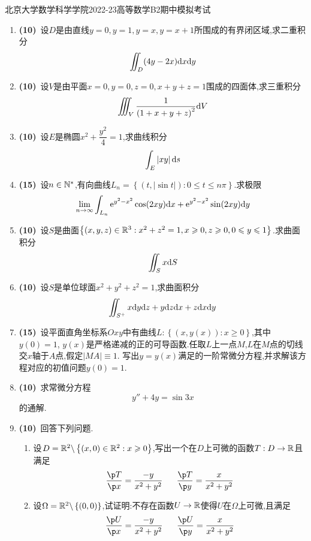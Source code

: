 \documentclass{ctexart}
\begin{document}
\pagestyle{empty}
\begin{center}\Large
    北京大学数学科学学院2022-23高等数学B2期中模拟考试
\end{center}
\begin{enumerate}[leftmargin=*,label=\textbf{\arabic*.}]
    \item \textbf{(10)}\ 设$D$是由直线$y=0,y=1,y=x,y=x+1$所围成的有界闭区域,求二重积分
        \[\iint_D(4y-2x)\mathrm{d} x\mathrm{d} y\]
    \item \textbf{(10)}\ 设$V$是由平面$x=0,y=0,z=0,x+y+z=1$围成的四面体,求三重积分
        \[\iiint_V\dfrac{1}{\left(1+x+y+z\right)^2}\mathrm{d} V\]
    \item \textbf{(10)}\ 设$E$是椭圆$x^2+\dfrac{y^2}{4}=1$,求曲线积分
        \[\int_E\left|xy\right|\mathrm{d} s\]
    \item \textbf{(15)}\ 设$n\in\mathbb{N}^*$,有向曲线$L_n=\left\{\left(t,\left|\sin t\right|\right):0\leqslant t\leqslant n\pi\right\}$.求极限
        \[\lim_{n\to\infty}\int_{L_n}\mathrm{e}^{y^2-x^2}\cos(2xy)\mathrm{d} x+\mathrm{e}^{y^2-x^2}\sin(2xy)\mathrm{d} y\]
    \item \textbf{(10)}\ 设$S$是曲面$\left\{(x,y,z)\in\mathbb{R}^3:x^2+z^2=1,x\geqslant 0,z\geqslant 0,0\leqslant y\leqslant 1\right\}$.求曲面积分
        \[\iint_Sx\mathrm{d} S\]
    \item \textbf{(10)}\ 设$S$是单位球面$x^2+y^2+z^2=1$,求曲面积分
        \[\iint_{S^+}x\mathrm{d} y\mathrm{d} z+y\mathrm{d} z\mathrm{d} x+z\mathrm{d} x\mathrm{d} y\]
    \item \textbf{(15)}\ 设平面直角坐标系$Oxy$中有曲线$L:\left\{(x,y(x)):x\geqslant0\right\}$,其中$y(0)=1$,%
        $y(x)$是严格递减的正的可导函数.任取$L$上一点$M$,$L$在$M$点的切线交$x$轴于$A$点,假定$\left|MA\right|\equiv1$.%
        写出$y=y(x)$满足的一阶常微分方程,并求解该方程对应的初值问题$y(0)=1$.
    \item \textbf{(10)}\ 求常微分方程
        \[y''+4y=\sin3x\]
        的通解.
    \item \textbf{(10)}\ 回答下列问题.
        \begin{enumerate}[label=\tbf{(\arabic*)}]
            \item 设$D=\mathbb{R}^2\backslash\left\{(x,0)\in\mathbb{R}^2:x\geqslant 0\right\}$,写出一个在$D$上可微的函数$T:D\to\mathbb{R}$且满足
                \[\dfrac{\p T}{\p x}=\dfrac{-y}{x^2+y^2}\ \ \ \ \ \dfrac{\p T}{\p y}=\dfrac{x}{x^2+y^2}\]
            \item 设$\Omega=\mathbb{R}^2\backslash\left\{(0,0)\right\}$,试证明:不存在函数$U\to\mathbb{R}$使得$U$在$\Omega$上可微,且满足
                \[\dfrac{\p U}{\p x}=\dfrac{-y}{x^2+y^2}\ \ \ \ \ \dfrac{\p U}{\p y}=\dfrac{x}{x^2+y^2}\]
        \end{enumerate}
\end{enumerate}
\end{document}
